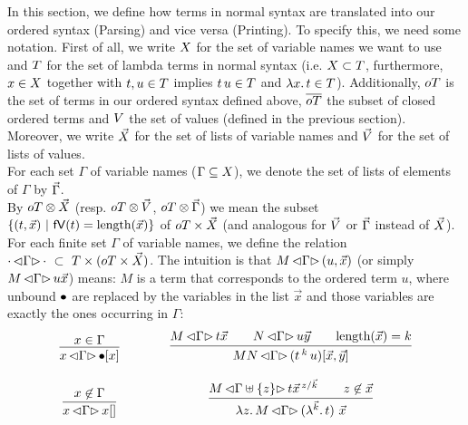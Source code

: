 \documentclass[submission,copyright,creativecommons]{eptcs}
\begin{document}
In this section, we define how terms in normal syntax are translated into our ordered syntax (Parsing) and vice versa (Printing). 
To specify this, we need some notation. 
First of all, we write $X$ for the set of variable names we want to use and $T$ for the set of lambda terms in normal syntax (i.e. $X \subset T$, furthermore, $x \in X$ together with $t, u \in T$ implies $t \, u \in T$ and $\lambda {x}. \, t \in T$). Additionally, $oT$ is the set of terms in our ordered syntax defined above, $\overline{oT}$ the subset of closed ordered terms and $V$ the set of values (defined in the previous section).
Moreover, we write $\vec {X}$ for the set of lists of variable names and $\vec {V}$ for the set of lists of values. 
\\
For each set $\Gamma$ of variable names ($\Gamma \subseteq X$), we denote the set of lists of elements of $\Gamma$ by $\vec \Gamma$. 
\\
By $oT \otimes \vec {X}$ (resp. $oT \otimes \vec {V}$, $oT \otimes \vec \Gamma$) we mean the subset $\{(t, \vec x) \ | \ \mathsf{fV}(t) = \mbox{length}(\vec x) \}$ of $oT \times \vec {X}$ (and analogous for $\vec {V}$ or $\vec \Gamma$ instead of $\vec {X}$).
\\
For each finite %
set $\Gamma$ of variable names, we define the relation
$\cdot \, { \mathord{\lhd} {\Gamma} \mathord{\rhd} } \, \cdot \ \subset \  T \times (oT \times \vec {X})$.
The intuition is that $M \, { \mathord{\lhd} {\Gamma} \mathord{\rhd} } \, (u, \vec x)$ (or simply $M \, { \mathord{\lhd} {\Gamma} \mathord{\rhd} } \, u \vec x$) means: $M$ is a term that corresponds to the ordered term $u$, where unbound $\mathord{\bullet}$ are replaced by the variables in the list $\vec x$ and those variables are exactly the ones occurring in $\Gamma$:
\[
\begin{array}{c@{\qquad\qquad} c}
\infru{x \in \Gamma}{\parse x \Gamma {\ovar \ve x}}
&
\infru{ {\parse M \Gamma {t \vec x}} \qquad {\parse N \Gamma {u \vec y}} \qquad {\length{\vec x} = k} } {\parse {MN} {\Gamma} {(\ApO t k u) [\vec x, \vec y]} } 
\\ \\
\infru{x \not\in \Gamma}{\parse x \Gamma {x \emptyVec}}
&
\infru{ 
         {\parse M { \Gamma \uplus \{z\} } {       t \multiinsert{\vec x}{\vec k}{z}   }} 
          \qquad 
          z \not\in \vec x  }
          {\parse {\LaA z M} {\Gamma} {(\LaO {\vec{k}} t) \ \vec x}}
\end{array}
\]
\end{document}
